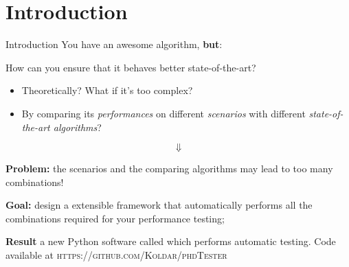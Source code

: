 \section*{Introduction}

\begin{frame}{Introduction}
    You have an awesome algorithm, \textbf{but}:
    
    \begin{center}
        \color{blue} How can you ensure that it behaves better \wrt{} state-of-the-art?
    \end{center}

    \begin{itemize}
        \item Theoretically? What if it's too complex?
        \item By comparing its \textit{performances} on different \textit{scenarios} with different \textit{state-of-the-art algorithms}? 
    \end{itemize}

    $$\Downarrow$$

    \textbf{Problem:} the scenarios and the comparing algorithms may lead to too many combinations!
    
    \textbf{Goal:} design a extensible framework that automatically performs all the combinations required for your performance testing;

    \textbf{Result} a new Python software called  which performs automatic testing. Code available at \textsc{https://github.com/Koldar/phdTester} 
\end{frame}

